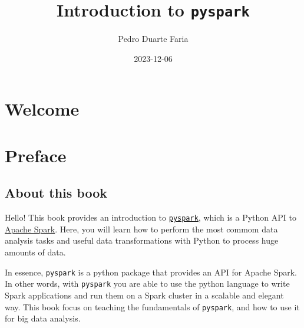 \documentclass[
  11pt,
  letterpaper,
  DIV=11,
  numbers=noendperiod]{scrreprt}
\title{Introduction to \texttt{pyspark}}
\author{Pedro Duarte Faria}
\date{2023-12-06}
\renewcommand*\contentsname{Table of contents}
\newcommand\contentsname{Table of contents}
\begin{document}
\maketitle
\ifdefined\Shaded\renewenvironment{Shaded}{\begin{tcolorbox}[breakable, interior hidden, sharp corners, borderline west={3pt}{0pt}{shadecolor}, boxrule=0pt, frame hidden, enhanced]}{\end{tcolorbox}}\fi

\renewcommand*\contentsname{Table of contents}
{
\hypersetup{linkcolor=}
\setcounter{tocdepth}{2}
\tableofcontents
}

\hypertarget{welcome}{%
\chapter*{Welcome}\label{welcome}}



\hypertarget{preface}{%
\chapter*{Preface}\label{preface}}


\hypertarget{about-this-book-1}{%
\section*{About this book}\label{about-this-book-1}}


Hello! This book provides an introduction to
\href{https://spark.apache.org/docs/latest/api/python/}{\texttt{pyspark}},
which is a Python API to \href{https://spark.apache.org/}{Apache Spark}.
Here, you will learn how to perform the most commom data analysis tasks
and useful data transformations with Python to process huge amounts of
data.

In essence, \texttt{pyspark} is a python package that provides an API
for Apache Spark. In other words, with \texttt{pyspark} you are able to
use the python language to write Spark applications and run them on a
Spark cluster in a scalable and elegant way. This book focus on teaching
the fundamentals of \texttt{pyspark}, and how to use it for big data
analysis.
\end{document}
